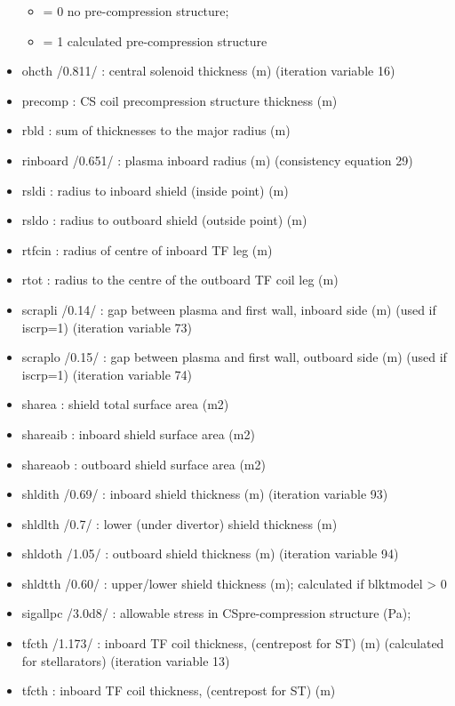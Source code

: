 \documentclass[]{article}
\begin{document}
\begin{itemize}
  \begin{itemize}
  \itemsep1pt\parskip0pt
  \item
    = 0 no pre-compression structure;
  \item
    = 1 calculated pre-compression structure
  \end{itemize}
\item
  ohcth /0.811/ : central solenoid thickness (m) (iteration variable 16)
\item
  precomp : CS coil precompression structure thickness (m)
\item
  rbld : sum of thicknesses to the major radius (m)
\item
  rinboard /0.651/ : plasma inboard radius (m) (consistency equation 29)
\item
  rsldi : radius to inboard shield (inside point) (m)
\item
  rsldo : radius to outboard shield (outside point) (m)
\item
  rtfcin : radius of centre of inboard TF leg (m)
\item
  rtot : radius to the centre of the outboard TF coil leg (m)
\item
  scrapli /0.14/ : gap between plasma and first wall, inboard side (m)
  (used if iscrp=1) (iteration variable 73)
\item
  scraplo /0.15/ : gap between plasma and first wall, outboard side (m)
  (used if iscrp=1) (iteration variable 74)
\item
  sharea : shield total surface area (m2)
\item
  shareaib : inboard shield surface area (m2)
\item
  shareaob : outboard shield surface area (m2)
\item
  shldith /0.69/ : inboard shield thickness (m) (iteration variable 93)
\item
  shldlth /0.7/ : lower (under divertor) shield thickness (m)
\item
  shldoth /1.05/ : outboard shield thickness (m) (iteration variable 94)
\item
  shldtth /0.60/ : upper/lower shield thickness (m); calculated if
  blktmodel \textgreater{} 0
\item
  sigallpc /3.0d8/ : allowable stress in CSpre-compression structure
  (Pa);
\item
  tfcth /1.173/ : inboard TF coil thickness, (centrepost for ST) (m)
  (calculated for stellarators) (iteration variable 13)
\item
  tfcth : inboard TF coil thickness, (centrepost for ST) (m)

\end{itemize}
\end{document}
